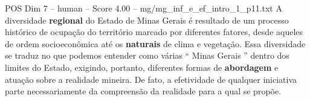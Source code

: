 \begin{textsample}{POS Dim 7 – human – Score 4.00 – mg/mg\_inf\_e\_ef\_intro\_1\_p11.txt}  \label{ex:f7_pos_008}
A diversidade \textbf{regional} do Estado de Minas Gerais é resultado de um processo histórico de ocupação do território marcado por diferentes fatores, desde aqueles de ordem socioeconômica até os \textbf{naturais} de clima e vegetação.
Essa diversidade se traduz no que podemos entender como várias “ Minas Gerais ” dentro dos limites do Estado, exigindo, portanto, diferentes formas de \textbf{abordagem} e atuação sobre a realidade mineira.
De fato, a efetividade de qualquer iniciativa parte necessariamente da compreensão da realidade para a qual se propõe.

\end{textsample}
